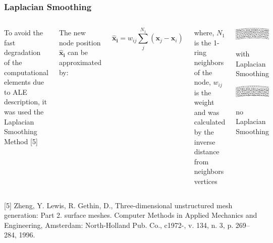 \begin{frame}
 \frametitle{\LARGE Laplacian Smoothing}

\vspace{-0.8cm}
\begin{columns}[c]
\justifying
To avoid the fast degradation of the computational elements
due to ALE description, it was used the Laplacian Smoothing Method [5]

\smallskip
The new node position $\mathbf{\hat{x}_{i}}$ can be approximated by:

\begin{equation*}
\mathbf{\hat{x}_{i}} = w_{ij} \sum_{j}^{N_{1}} (\mathbf{x}_{j} - \mathbf{x}_{i})
\end{equation*}

\smallskip
where,
$N_{1}$ is the 1-ring neighbors of the node,
$w_{ij}$ is the weight and was calculated by the inverse distance from neighbors vertices


\vspace{-1cm}
\begin{center}
  \includegraphics[scale=0.2]{images/Smoothing.png}
  \caption{\scriptsize with Laplacian Smoothing}

  \vspace{1.0cm}
  \includegraphics[scale=0.2]{images/noSmoothing.png}
  \caption{\scriptsize no Laplacian Smoothing}
\end{center}
\end{columns}

\vspace{1cm}
\tiny [5] Zheng,  Y.  Lewis,  R.  Gethin,  D., Three-dimensional unstructured mesh generation: Part 2. surface meshes. Computer Methods in Applied Mechanics and Engineering, Amsterdam: North-Holland Pub. Co., c1972-, v. 134, n. 3, p. 269–284, 1996.
\end{frame}






